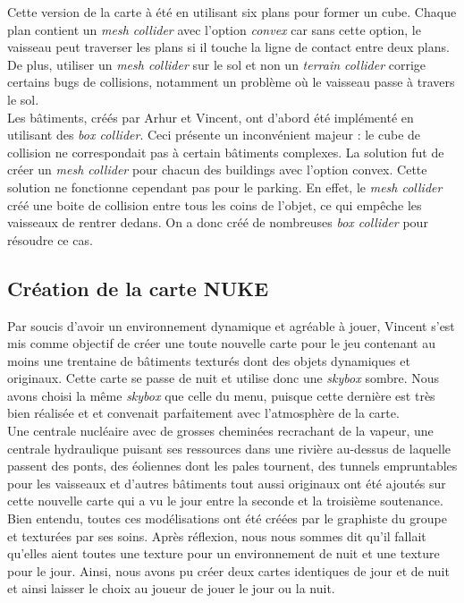 \documentclass[12pt, titlepage]{article}
\begin{document}
\begin{spacing}{1.5}
Cette version de la carte à été en utilisant six plans pour former un cube. Chaque plan contient un \textit{mesh collider} avec l’option \textit{convex} car sans cette option, le vaisseau peut traverser les plans si il touche la ligne de contact entre deux plans. De plus, utiliser un \textit{mesh collider} sur le sol et non un \textit{terrain collider} corrige certains bugs de collisions, notamment un problème où le vaisseau passe à travers le sol.\\

Les bâtiments, créés par Arhur et Vincent, ont d'abord été implémenté en utilisant des \textit{box collider}. Ceci présente un inconvénient majeur : le cube de collision ne correspondait pas à certain bâtiments complexes. La solution fut de créer un \textit{mesh collider} pour chacun des buildings avec l'option convex. Cette solution ne fonctionne cependant pas pour le parking. En effet, le \textit{mesh collider} créé une boite de collision entre tous les coins de l'objet, ce qui empêche les vaisseaux de rentrer dedans. On a donc créé de nombreuses \textit{box collider} pour résoudre ce cas.

\subsection{Création de la carte NUKE }

Par soucis d'avoir un environnement dynamique et agréable à jouer, Vincent s’est mis comme objectif de créer une toute nouvelle carte pour le jeu contenant au moins une trentaine de bâtiments texturés dont des objets dynamiques et originaux. Cette carte se passe de nuit et utilise donc une \textit{skybox} sombre. Nous avons choisi la même \textit{skybox} que celle du menu, puisque cette dernière est très bien réalisée et et convenait parfaitement avec l'atmosphère de la carte.\\

Une centrale nucléaire avec de grosses cheminées recrachant de la vapeur, une centrale hydraulique puisant ses ressources dans une rivière au-dessus de laquelle passent des ponts, des éoliennes dont les pales tournent, des tunnels empruntables pour les vaisseaux et d’autres bâtiments tout aussi originaux ont été ajoutés sur cette nouvelle carte qui a vu le jour entre la seconde et la troisième soutenance. Bien entendu, toutes ces modélisations ont été créées par le graphiste du groupe et texturées par ses soins. Après réflexion, nous nous sommes dit qu'il fallait qu'elles aient toutes une texture pour un environnement de nuit et une texture pour le jour. Ainsi, nous avons pu créer deux cartes identiques de jour et de nuit et ainsi laisser le choix au joueur de jouer le jour ou la nuit.\\


\end{spacing}
\end{document}
